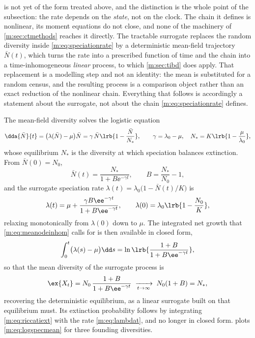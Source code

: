  is not yet of the form treated above, and the
distinction is the whole point of the subsection: the rate depends on the
\emph{state}, not on the clock. The chain it defines is nonlinear, its moment
equations do not close, and none of the machinery of \cref{m:sec:ctmethods}
reaches it directly. The tractable surrogate replaces the random diversity inside
\cref{m:eq:speciationrate} by a deterministic mean-field trajectory $\bar N(t)$,
which turns the rate into a prescribed function of time and the chain into a
time-inhomogeneous \emph{linear} process, to which \cref{m:sec:tibd} does apply.
That replacement is a modelling step and not an identity: the mean is substituted
for a random census, and the resulting process is a comparison object rather than
an exact reduction of the nonlinear chain. Everything that follows is accordingly
a statement about the surrogate, not about the chain \cref{m:eq:speciationrate}
defines.

The mean-field diversity solves the logistic equation
\begin{equation}
\label{m:eq:logisticode}
\dda{\bar N}{t} = \bigl(\lambda(\bar N)-\mu\bigr)\bar N
= \gamma\,\bar N\lrb{1-\frac{\bar N}{N_\ast}},
\qquad
\gamma = \lambda_0-\mu,
\quad
N_\ast = K\lrb{1-\frac{\mu}{\lambda_0}},
\end{equation}
whose equilibrium $N_\ast$ is the diversity at which speciation balances
extinction. From $\bar N(0)=N_0$,
\begin{equation}
\label{m:eq:logisticsol}
\bar N(t) = \frac{N_\ast}{1+B\ee^{-\gamma t}},
\qquad
B = \frac{N_\ast}{N_0}-1 ,
\end{equation}
and the surrogate speciation rate $\lambda(t)=\lambda_0\bigl(1-\bar N(t)/K\bigr)$
is
\begin{equation}
\label{m:eq:lambdat}
\lambda(t) = \mu + \frac{\gamma B\ee^{-\gamma t}}{1+B\ee^{-\gamma t}},
\qquad
\lambda(0) = \lambda_0\lrb{1-\frac{N_0}{K}} ,
\end{equation}
relaxing monotonically from $\lambda(0)$ down to $\mu$. The integrated net growth
that \cref{m:eq:meanodeinhom} calls for is then available in closed form,
\begin{equation}
\label{m:eq:lambdaint}
\int_0^t\bigl(\lambda(s)-\mu\bigr)\dd s
= \ln\lrb{\frac{1+B}{1+B\ee^{-\gamma t}}} ,
\end{equation}
so that the mean diversity of the surrogate process is
\begin{equation}
\label{m:eq:logspecmean}
\ex{X_t} = N_0\,\frac{1+B}{1+B\ee^{-\gamma t}}
\;\xrightarrow[t\to\infty]{}\;
N_0(1+B) = N_\ast ,
\end{equation}
recovering the deterministic equilibrium, as a linear surrogate built on that
equilibrium must. Its extinction probability follows by integrating
\cref{m:eq:riccatiext} with the rate \cref{m:eq:lambdat}, and no longer in closed
form.  plots \cref{m:eq:logspecmean} for three founding
diversities.

